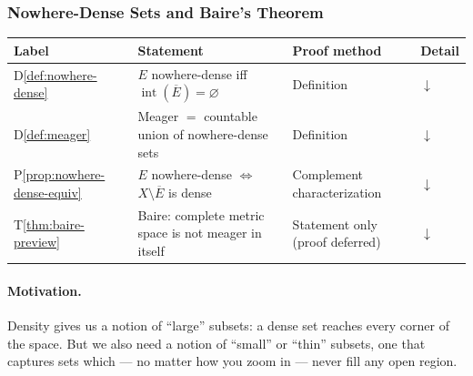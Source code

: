 %

\subsubsection{Nowhere-Dense Sets and Baire's Theorem}
\label{sec:nowhere-dense-baire}

\begin{tcolorbox}[colback=gray!6, colframe=gray!40, arc=2pt,
  left=6pt, right=6pt, top=4pt, bottom=4pt,
  title={\small\textbf{Nowhere-Dense Sets and Baire --- Quick Reference}},
  fonttitle=\small\bfseries]
\small
\begin{tabular}{l l l l}
\toprule
\textbf{Label} & \textbf{Statement} & \textbf{Proof method} & \textbf{Detail} \\
\midrule
D\ref{def:nowhere-dense}
  & $E$ nowhere-dense iff $\operatorname{int}(\overline{E}) = \varnothing$
  & Definition
  & \hyperref[def:nowhere-dense]{$\downarrow$} \\[4pt]
D\ref{def:meager}
  & Meager $=$ countable union of nowhere-dense sets
  & Definition
  & \hyperref[def:meager]{$\downarrow$} \\[4pt]
P\ref{prop:nowhere-dense-equiv}
  & $E$ nowhere-dense $\iff$ $X \setminus \overline{E}$ is dense
  & Complement characterization
  & \hyperref[prop:nowhere-dense-equiv]{$\downarrow$} \\[4pt]
T\ref{thm:baire-preview}
  & Baire: complete metric space is not meager in itself
  & Statement only (proof deferred)
  & \hyperref[thm:baire-preview]{$\downarrow$} \\[4pt]
\bottomrule
\end{tabular}
\end{tcolorbox}

\paragraph{Motivation.}
Density gives us a notion of ``large'' subsets: a dense set reaches
every corner of the space.
But we also need a notion of ``small'' or ``thin'' subsets,
one that captures sets which --- no matter how you zoom in ---
never fill any open region.

